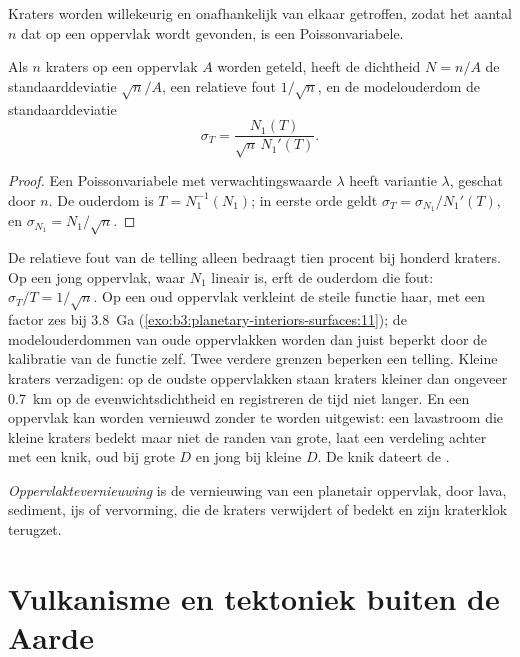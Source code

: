 Kraters worden willekeurig en onafhankelijk van elkaar getroffen, zodat het aantal
$n$ dat op een oppervlak wordt gevonden, is een Poissonvariabele.

\begin{proposition}\label{prop:b3:planetary-interiors-surfaces:poisson}
Als $n$ kraters op een oppervlak $A$ worden geteld, heeft de dichtheid $N = n/A$ de
standaarddeviatie $\sqrt n/A$, een relatieve fout $1/\sqrt n$, en de
modelouderdom de standaarddeviatie
\[
  \sigma_T = \frac{N_1(T)}{\sqrt n\,N_1'(T)} .
\]
\end{proposition}

\begin{proof}
Een Poissonvariabele met verwachtingswaarde $\lambda$ heeft variantie $\lambda$, geschat door
$n$. De ouderdom is $T = N_1^{-1}(N_1)$; in eerste orde geldt $\sigma_T =
\sigma_{N_1}/N_1'(T)$, en $\sigma_{N_1} = N_1/\sqrt n$.
\end{proof}

De relatieve fout van de telling alleen bedraagt tien procent bij honderd
kraters. Op een jong oppervlak, waar $N_1$ lineair is, erft de ouderdom die fout:
$\sigma_T/T = 1/\sqrt n$. Op een oud oppervlak verkleint de steile functie haar, met
een factor zes bij \qty{3.8}{Ga} (\cref{exo:b3:planetary-interiors-surfaces:11});
de modelouderdommen van oude oppervlakken worden dan juist beperkt door de kalibratie
van de functie zelf. Twee verdere grenzen beperken een telling. Kleine kraters verzadigen:
op de oudste oppervlakken staan kraters kleiner dan ongeveer \qty{0.7}{km} op de
evenwichtsdichtheid en registreren de tijd niet langer. En een oppervlak kan worden
vernieuwd zonder te worden uitgewist: een lavastroom die kleine kraters bedekt maar niet de
randen van grote, laat een verdeling achter met een knik, oud bij grote $D$ en
jong bij kleine $D$. De knik dateert de .

\begin{definition}[Oppervlaktevernieuwing]\label{def:b3:planetary-interiors-surfaces:resurfacing}
\emph{Oppervlaktevernieuwing} is de vernieuwing van een planetair
oppervlak, door lava, sediment, ijs of vervorming, die de kraters verwijdert of bedekt en
zijn kraterklok terugzet.
\end{definition}

\section{Vulkanisme en tektoniek buiten de Aarde}\label{sec:b3:planetary-interiors-surfaces:volcanism}

